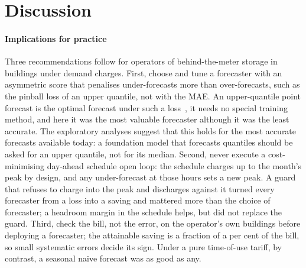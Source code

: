 \section{Discussion}\label{sec:discussion}

\paragraph{Implications for practice} Three recommendations follow for operators of behind-the-meter storage in buildings under demand charges. First, choose and tune a forecaster with an asymmetric score that penalises under-forecasts more than over-forecasts, such as the pinball loss of an upper quantile, not with the MAE. An upper-quantile point forecast is the optimal forecast under such a loss~\cite{gneiting2011point}, it needs no special training method, and here it was the most valuable forecaster although it was the least accurate. The exploratory analyses suggest that this holds for the most accurate forecasts available today: a foundation model that forecasts quantiles should be asked for an upper quantile, not for its median. Second, never execute a cost-minimising day-ahead schedule open loop: the schedule charges up to the month's peak by design, and any under-forecast at those hours sets a new peak. A guard that refuses to charge into the peak and discharges against it turned every forecaster from a loss into a saving and mattered more than the choice of forecaster; a headroom margin in the schedule helps, but did not replace the guard. Third, check the bill, not the error, on the operator's own buildings before deploying a forecaster; the attainable saving is a fraction of a per cent of the bill, so small systematic errors decide its sign. Under a pure time-of-use tariff, by contrast, a seasonal naive forecast was as good as any.

